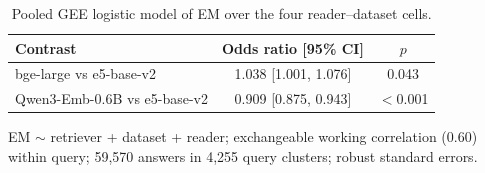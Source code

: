 \begin{table}[t]
\centering
\small
\caption{Pooled GEE logistic model of EM over the four reader--dataset cells.}
\label{tab:gee}
\begin{tabular}{lcc}
\toprule
Contrast & Odds ratio [95\% CI] & $p$ \\
\midrule
bge-large vs e5-base-v2 & 1.038 [1.001, 1.076] & 0.043 \\
Qwen3-Emb-0.6B vs e5-base-v2 & 0.909 [0.875, 0.943] & $<$0.001 \\
\bottomrule
\end{tabular}
\par\smallskip\parbox{\linewidth}{\footnotesize EM $\sim$ retriever + dataset + reader; exchangeable working correlation (0.60) within query; 59,570 answers in 4,255 query clusters; robust standard errors.}
\end{table}
